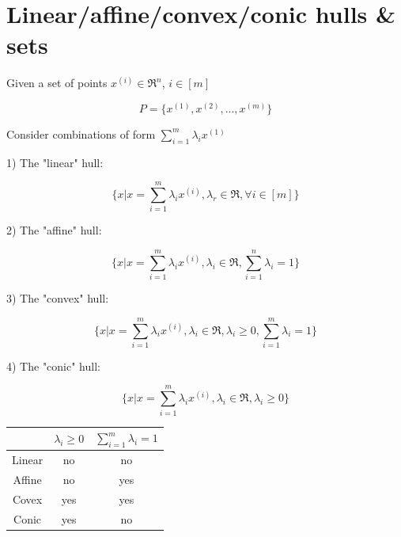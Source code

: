 
\section{Linear/affine/convex/conic hulls \& sets}
Given a set of points $x^{(i)} \in \Re^n$, $i\in [m]$

\begin{equation*}
P = \{x^{(1)}, x^{(2)},..., x^{(m)} \}
\end{equation*}

Consider combinations of form $\sum^m_{i=1} \lambda_i x^{(1)}$

1) The "linear" hull: 

\begin{equation*}
\{x|x = \sum^m_{i=1} \lambda_i x^{(i)}, \lambda_r\in \Re, \forall i\in [m] \}
\end{equation*}

2) The "affine" hull: 

\begin{equation*}
\{x|x = \sum^m_{i=1} \lambda_i x^{(i)}, \lambda_i\in \Re, \sum^n_{i=1}\lambda_i = 1 \}
\end{equation*}


3) The "convex" hull: 

\begin{equation*}
\{x|x = \sum^m_{i=1} \lambda_i x^{(i)}, \lambda_i\in \Re, \lambda_i \geq 0, \sum^m_{i=1}\lambda_i = 1 \}
\end{equation*}


4) The "conic" hull: 

\begin{equation*}
\{x|x = \sum^m_{i=1} \lambda_i x^{(i)}, \lambda_i\in \Re, \lambda_i \geq 0 \}
\end{equation*}


\begin{center}
	\begin{tabular}{|c|c|c|}
	\hline  
   & $\lambda_i \geq 0$   & $\sum^m_{i=1}\lambda_i = 1$ \\
	\hline  
Linear&  no  & no \\
	\hline  
Affine&  no  &yes  \\
	\hline 
Covex&  yes  & yes \\
	\hline  
Conic&  yes  &  no\\
	\hline 
\end{tabular}
\end{center}



